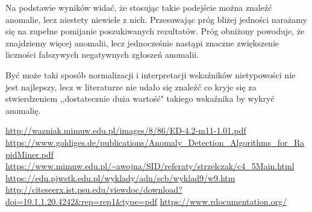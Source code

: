 \documentclass[11pt,a4paper,twoside]{article}
\begin{document}
Na podstawie wyników widać, że stosując takie podejście można znaleźć anomalie, lecz niestety niewiele z nich. Przesuwając próg bliżej jedności narażamy się na zupełne pomijanie poszukiwanych rezultatów. Próg obniżony powoduje, że znajdziemy więcej anomalii, lecz jednocześnie nastąpi znaczne zwiększenie liczności fałszywych negatywnych zgłoszeń anomalii.

Być może taki sposób normalizacji i interpretacji wskaźników nietypowości nie jest najlepszy, lecz w literaturze nie udało się znaleźć co kryje się za stwierdzeniem ,,dostatecznie duża wartość" takiego wskaźnika by wykryć anomalię.



\begin{thebibliography}{9}
\url{http://wazniak.mimuw.edu.pl/images/8/86/ED-4.2-m11-1.01.pdf}
\url{https://www.goldiges.de/publications/Anomaly_Detection_Algorithms_for_RapidMiner.pdf}
\url{https://www.mimuw.edu.pl/~awojna/SID/referaty/strzelczak/c4_5Main.html}
\url{https://edu.pjwstk.edu.pl/wyklady/adn/scb/wyklad9/w9.htm}
\url{http://citeseerx.ist.psu.edu/viewdoc/download?doi=10.1.1.20.4242&rep=rep1&type=pdf}
\url{https://www.rdocumentation.org/}


\end{thebibliography}
\end{document}
